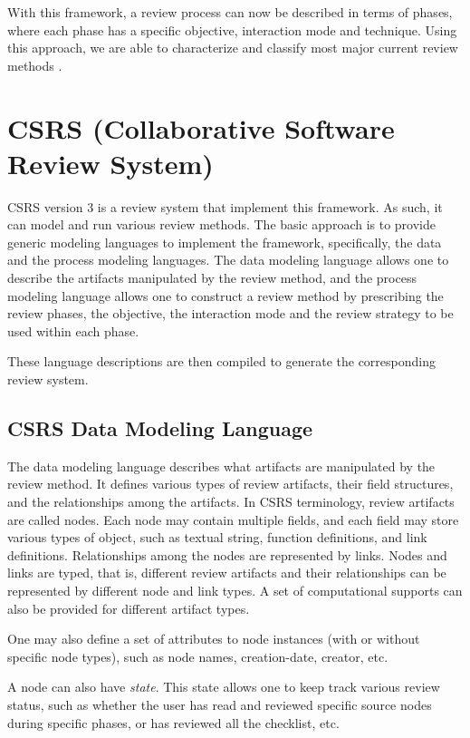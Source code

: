 With this framework, a review process can now be described in terms
of phases, where each phase has a specific objective, interaction mode
and technique. Using this approach, we are able to characterize and
classify most major current review methods \cite{Tjahjono94}.

\section {CSRS (Collaborative Software Review System)}

CSRS version 3 is a review system that implement this framework. As
such, it can model and run various review methods. The basic approach
is to provide generic modeling languages to implement the framework,
specifically, the data and the process modeling languages.
The data modeling language allows one to describe the artifacts
manipulated by the review method, and the process modeling language
allows one to construct a review method by 
prescribing the review phases, the objective, the interaction mode and
the review strategy to be used within each phase.

These language descriptions are then compiled to generate the
corresponding review system. 


\subsection{CSRS Data Modeling Language}

The data modeling language describes what artifacts are manipulated by
the review method. It defines various types of review
artifacts, their field structures, and the relationships among the
artifacts. In CSRS terminology, review artifacts are called nodes.
Each node may contain multiple fields, and each field may store
various types of object, such as 
textual string, function definitions, and link definitions.
Relationships among the nodes are represented by links.   
Nodes and links are typed, that is, different review artifacts and
their relationships can be represented by different node and link types. 
A set of computational supports can also be provided for different
artifact types.

One may also define a set of attributes to node instances (with or
without specific node types), such as node names, creation-date,
creator, etc. 

A node can also have {\it state}. This state allows one to
keep track various review status, such as whether the user has read
and reviewed specific source nodes during specific phases, or has
reviewed all the checklist, etc.

